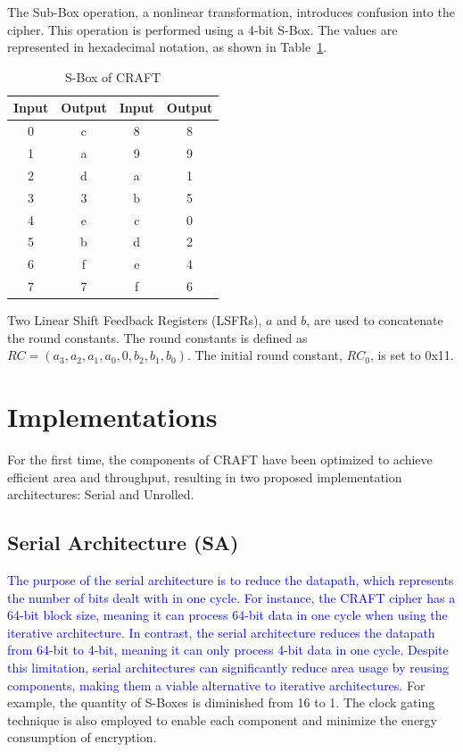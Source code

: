 \documentclass[final,5p,times,twocolumn]{elsarticle}
\begin{document}
The Sub-Box operation, a nonlinear transformation, introduces confusion into the cipher.
This operation is performed using a 4-bit S-Box. The values are represented in hexadecimal notation, as shown in Table~\ref{tab4}.

\begin{table}[h]
    \centering
    \caption{S-Box of CRAFT}\label{tab4}%
    \begin{tabular}{|c|c|c|c|}
        \hline
        Input & Output & Input & Output \\
        \hline
        0     & c      & 8     & 8      \\
        1     & a      & 9     & 9      \\
        2     & d      & a     & 1      \\
        3     & 3      & b     & 5      \\
        4     & e      & c     & 0      \\
        5     & b      & d     & 2      \\
        6     & f      & e     & 4      \\
        7     & 7      & f     & 6      \\
        \hline
    \end{tabular}
\end{table}

Two Linear Shift Feedback Registers (LSFRs), $a$ and $b$, are used to concatenate the round constants.
The round constants is defined as $RC=(a_3,a_2,a_1,a_0,0,b_2,b_1,b_0)$. The initial round constant, $RC_0$, is set to 0x11.

\section{Implementations}\label{sec3}

For the first time, the components of CRAFT have been optimized to achieve efficient area and throughput, resulting in two proposed implementation architectures: Serial and Unrolled.


\subsection{Serial Architecture (SA)}\label{subsec2}
\textcolor{blue}{The purpose of the serial architecture is to reduce the datapath, which represents the number of bits dealt with in one cycle. For instance, the CRAFT cipher has a 64-bit block size, meaning it can process 64-bit data in one cycle when using the iterative architecture. In contrast, the serial architecture reduces the datapath from 64-bit to 4-bit, meaning it can only process 4-bit data in one cycle. Despite this limitation, serial architectures can significantly reduce area usage by reusing components, making them a viable alternative to iterative architectures.}
For example, the quantity of S-Boxes is diminished from 16 to 1.
The clock gating technique is also employed to enable each component and minimize the energy consumption of encryption.
\end{document}
